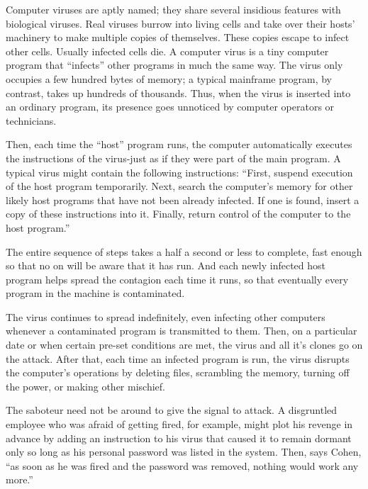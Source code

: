   Computer  viruses  are aptly named;  they  share  several  insidious 
features  with  biological viruses.  Real viruses burrow  into  living 
cells  and take over their hosts' machinery to make multiple copies of 
themselves.  These  copies  escape  to  infect  other  cells.  Usually 
infected cells die.  A computer virus is a tiny computer program  that 
``infects'' other programs in much the same way. The virus only occupies 
a  few  hundred  bytes of memory;  a  typical  mainframe  program,  by 
contrast,  takes  up hundreds of thousands.   Thus,  when the virus is 
inserted  into  an ordinary program,  its presence goes  unnoticed  by 
computer operators or technicians.  

  Then,  each time the ``host'' program runs, the computer automatically 
executes  the instructions of the virus-just as if they were  part  of 
the  main  program.  A  typical  virus  might  contain  the  following 
instructions:   ``First,   suspend   execution  of  the  host   program 
temporarily.  Next, search the computer's memory for other likely host 
programs that have not been already infected.  If one is found, insert 
a copy of these instructions into it.   Finally, return control of the 
computer to the host program.'' 

  The  entire  sequence  of  steps takes a half a second  or  less  to 
complete, fast enough so that no on will be aware that it has run. And 
each newly infected host program helps spread the contagion each  time 
it  runs,   so  that  eventually  every  program  in  the  machine  is 
contaminated.  

  The  virus  continues to spread indefinitely,  even infecting  other 
computers  whenever  a contaminated program is  transmitted  to  them. 
Then, on a particular date or when certain pre-set conditions are met, 
the virus and all it's clones go on the attack.  After that, each time 
an  infected  program  is  run,  the  virus  disrupts  the  computer's 
operations by deleting files,  scrambling the memory,  turning off the 
power, or making other mischief.  

  The  saboteur  need not be around to give the signal  to  attack.  A 
disgruntled  employee  who was afraid of getting fired,  for  example, 
might  plot  his revenge in advance by adding an  instruction  to  his 
virus  that  caused it to remain dormant only so long as his  personal 
password was listed in the system.   Then,  says Cohen, ``as soon as he 
was fired and the password was removed, nothing would work any more.'' 

